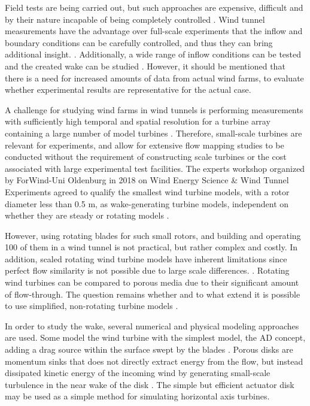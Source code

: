 Field tests are being carried out, but such approaches are expensive, difficult and by their nature incapable of being completely controlled \cite{Sforza1981}. Wind tunnel measurements have the advantage over full-scale experiments that the inflow and boundary conditions can be carefully controlled, and thus they can bring additional insight. \cite{Bossuyt2016}. Additionally, a wide range of inflow conditions can be tested and the created wake can be studied \cite{Sforza1981}. However, it should be mentioned that there is a need for increased amounts of data from actual wind farms, to evaluate whether experimental results are representative for the actual case. 

A challenge for studying wind farms in wind tunnels is performing measurements with sufficiently high temporal and spatial resolution for a turbine array containing a large number of model turbines \cite{Bossuyt2016}. Therefore, small-scale turbines are relevant for experiments, and allow for extensive flow mapping studies to be conducted without the requirement of constructing scale turbines or the cost associated with large experimental test facilities\cite{Harrison2010}. The experts workshop organized by ForWind-Uni Oldenburg in 2018 on Wind Energy Science \& Wind Tunnel Experiments agreed to qualify the smallest wind turbine models, with a rotor diameter less than 0.5 m, as wake-generating turbine models, independent on whether they are steady or rotating models \cite{Aubrun2019}.

However, using rotating blades for such small rotors, and building and operating 100 of them in a wind tunnel is not practical, but rather complex and costly. In addition, scaled rotating wind turbine models have inherent limitations since perfect flow similarity is not possible due to large scale differences. \cite{Bossuyt2016}. Rotating wind turbines can be compared to porous media due to their significant amount of flow-through. The question remains whether and to what extend it is possible to use simplified, non-rotating turbine models \cite{Neunaber}. 


In order to study the wake, several numerical and physical modeling approaches are used. Some model the wind turbine with the simplest model, the AD concept, adding a drag source within the surface swept by the blades \cite{Aubrun2013}. Porous disks are momentum sinks that does not directly extract energy from the flow, but instead dissipated kinetic energy of the incoming wind by generating small-scale turbulence in the near wake of the disk \cite{Lignarolo2016}. The simple but efficient actuator disk may be used as a simple method for simulating horizontal axis turbines. 


